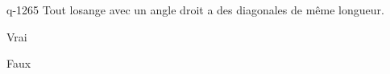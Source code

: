 \begin{truefalse}{q-1265}
Tout losange avec un angle droit a des diagonales de même longueur.
\item* Vrai
\item Faux
\end{truefalse}

